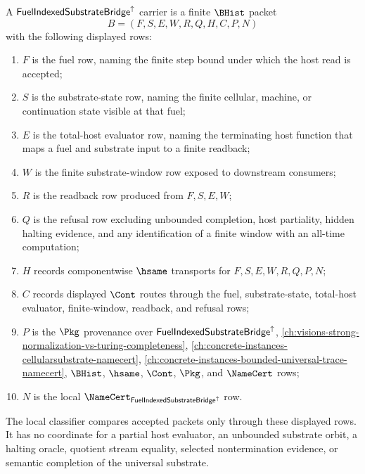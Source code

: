 \begin{definition}
\label{def:fuel-indexed-substrate-bridge-carrier}
A $\mathsf{FuelIndexedSubstrateBridge}^{\uparrow}$ carrier is a finite $\BHist$ packet
$$
B=(F,S,E,W,R,Q,H,C,P,N)
$$
with the following displayed rows:
\begin{enumerate}
\item $F$ is the fuel row, naming the finite step bound under which the host read is accepted;
\item $S$ is the substrate-state row, naming the finite cellular, machine, or continuation state visible at that fuel;
\item $E$ is the total-host evaluator row, naming the terminating host function that maps a fuel and substrate input to a finite readback;
\item $W$ is the finite substrate-window row exposed to downstream consumers;
\item $R$ is the readback row produced from $F,S,E,W$;
\item $Q$ is the refusal row excluding unbounded completion, host partiality, hidden halting evidence, and any identification of a finite window with an all-time computation;
\item $H$ records componentwise $\hsame$ transports for $F,S,E,W,R,Q,P,N$;
\item $C$ records displayed $\Cont$ routes through the fuel, substrate-state, total-host evaluator, finite-window, readback, and refusal rows;
\item $P$ is the $\Pkg$ provenance over $\mathsf{FuelIndexedSubstrateBridge}^{\uparrow}$, \autoref{ch:visions-strong-normalization-vs-turing-completeness}, \autoref{ch:concrete-instances-cellularsubstrate-namecert}, \autoref{ch:concrete-instances-bounded-universal-trace-namecert}, $\BHist$, $\hsame$, $\Cont$, $\Pkg$, and $\NameCert$ rows;
\item $N$ is the local $\NameCert_{\FuelIndexedSubstrateBridgeUp}$ row.
\end{enumerate}
The local classifier compares accepted packets only through these displayed rows. It has no coordinate for a partial host evaluator, an unbounded substrate orbit, a halting oracle, quotient stream equality, selected nontermination evidence, or semantic completion of the universal substrate.
\end{definition}

